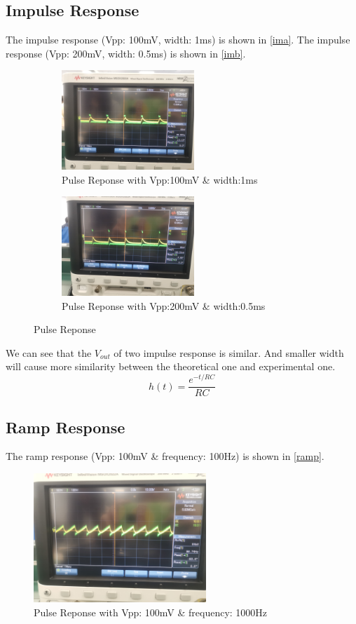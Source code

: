 \documentclass[a4paper]{article}
\begin{document}
    \subsection{Impulse Response}
    The impulse response (Vpp: 100mV, width: 1ms) is shown in \autoref{ima}. The impulse response (Vpp: 200mV, width: 0.5ms) is shown in \autoref{imb}. 
    \begin{figure}[h]
        \centering
        \begin{subfigure}{0.45\textwidth}
            \includegraphics[width=5cm]{impulse1.jpg}
            \caption{Pulse Reponse with Vpp:100mV \& width:1ms}
            \label{ima}
        \end{subfigure}
        \begin{subfigure}{0.45\textwidth}
            \includegraphics[width=5cm]{impulseb.jpg}
            \caption{Pulse Reponse with Vpp:200mV \& width:0.5ms}
            \label{imb}
        \end{subfigure}
        \caption{Pulse Reponse}
        \label{fig:PR}
    \end{figure}
    We can see that the $V_{out}$ of two impulse response is similar. And smaller width will cause more similarity between the theoretical one and experimental one.
    \begin{equation*}
        h(t) = \frac{e^{-t/RC}}{RC}
    \end{equation*}

    \subsection{Ramp Response}
    The ramp response (Vpp: 100mV \& frequency: 100Hz) is shown in \autoref{ramp}.
    \begin{figure}[h]
        \centering
        \includegraphics[width=6.5cm]{ramp.jpg}
        \caption{Pulse Reponse with Vpp: 100mV \& frequency: 1000Hz}
        \label{ramp}
    \end{figure}
\end{document}
